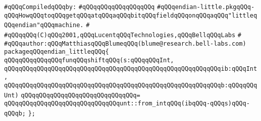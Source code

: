 \label{src/app/c-glue-maker/endian-little.pkg}
\newline
\verb|#qQQqCompiledqQQqby:|\newline
\verb|#qQQqqQQqqQQqqQQqqQQq|\newline
\newline
\verb|#qQQqendian-little.pkgqQQq-qQQqHowqQQqtoqQQqgetqQQqatqQQqaqQQqbitqQQqfieldqQQqonqQQqaqQQq"littleqQQqendian"qQQqmachine.|\newline
\verb|#|\newline
\verb|#qQQqqQQq(C)qQQq2001,qQQqLucentqQQqTechnologies,qQQqBellqQQqLabs|\newline
\verb|#|\newline
\verb|#qQQqauthor:qQQqMatthiasqQQqBlumeqQQq(blume@research.bell-labs.com)|\newline
\newline
\verb|packageqQQqendian_littleqQQq{|\newline
\newline
\verb|qQQqqQQqqQQqqQQqfunqQQqshiftqQQq(s:qQQqqQQqInt,|\newline
\verb|qQQqqQQqqQQqqQQqqQQqqQQqqQQqqQQqqQQqqQQqqQQqqQQqqQQqqQQqqQQqib:qQQqInt,|\newline
\verb|qQQqqQQqqQQqqQQqqQQqqQQqqQQqqQQqqQQqqQQqqQQqqQQqqQQqqQQqqQQqb:qQQqqQQqUnt)|\newline
\verb|qQQqqQQqqQQqqQQqqQQqqQQqqQQqqQQq=|\newline
\verb|qQQqqQQqqQQqqQQqqQQqqQQqqQQqqQQqunt::from_intqQQq(ibqQQq-qQQqs)qQQq-qQQqb;|\newline
\verb|};|\newline

